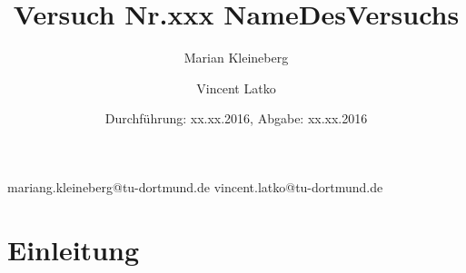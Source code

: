 \documentclass[paper=a4]{scrartcl}
\title{Versuch Nr.xxx \quad\quad\quad\quad\quad\quad\quad\quad\quad\quad\quad\quad NameDesVersuchs}
\author{Marian Kleineberg\and Vincent Latko}
\date{Durchführung: xx.xx.2016, Abgabe: xx.xx.2016}
\begin{document}
\maketitle
\thispagestyle{empty}
\vfill
mariang.kleineberg@tu-dortmund.de \qquad\qquad\qquad\qquad\qquad\qquad vincent.latko@tu-dortmund.de
\newpage
\tableofcontents
\newpage

\section{Einleitung}
\end{document}
